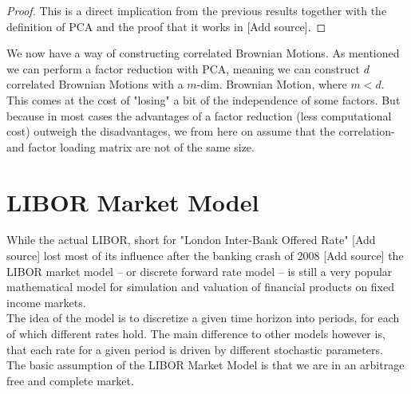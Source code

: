 \documentclass[12pt]{article}
\begin{document}
	\begin{proof}
		This is a direct implication from the previous results together with the definition of PCA and the proof that it works in \color{red}[Add source]\color{black}. %
	\end{proof}
	We now have a way of constructing correlated Brownian Motions. As mentioned we can perform a factor reduction with PCA, meaning we can construct $d$ correlated Brownian Motions with a $m$-dim. Brownian Motion, where $m < d$. This comes at the cost of "losing" a bit of the independence of some factors. But because in most cases the advantages of a factor reduction (less computational cost) outweigh the disadvantages, we from here on assume that the correlation- and factor loading matrix are not of the same size.
	
	
	
	
	\pagebreak
	\section{LIBOR Market Model}\label{sec::LIBORModel}
	
	While the actual LIBOR, short for "London Inter-Bank Offered Rate" \color{red}[Add source] \color{black} %
	lost most of its influence after the banking crash of 2008 \color{red}[Add source] \color{black} %
	the LIBOR market model -- or discrete forward rate model -- is still a very popular mathematical model for simulation and valuation of financial products on fixed income markets.\\
	The idea of the model is to discretize a given time horizon into periods, for each of which different rates hold. The main difference to other models however is, that each rate for a given period is driven by different stochastic parameters.
	\\
	The basic assumption of the LIBOR Market Model is that we are in an arbitrage free and complete market.
	
\end{document}
